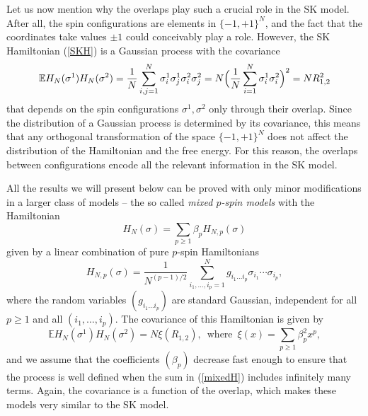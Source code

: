 \documentclass[12pt]{article}
\newcommand{\e}{\mathbb{E}}
\theoremstyle{nonumberplain}
\begin{document}
Let us now mention why the overlaps play such a crucial role in the SK model. After all, the spin configurations are elements in $\{-1,+1\}^N$, and the fact that the coordinates take values $\pm 1$ could conceivably play a role. However, the SK Hamiltonian (\ref{SKH}) is a Gaussian process with the covariance 
\begin{equation}
\e H_N(\sigma^1)H_N(\sigma^2)
=
\frac{1}{N} \sum_{i,j =1}^N \sigma_i^1 \sigma_j^1  \sigma_i^2 \sigma_j^2
=
N\Bigl(
\frac{1}{N} \sum_{i=1}^N \sigma_i^1  \sigma_i^2 
\Bigr)^2
=
N R_{1,2}^2
\label{Cov}
\end{equation}
that depends on the spin configurations $\sigma^1, \sigma^2$ only through their overlap. Since the distribution of a Gaussian process is determined by its covariance, this means that any orthogonal transformation of the space $\{-1,+1\}^N$ does not affect the distribution of the Hamiltonian and the free energy. For this reason, the overlaps between configurations encode all the relevant information in the SK model. 

All the results we will present below can be proved with only minor modifications in a larger class of models -- the so called \emph{mixed $p$-spin models} with the Hamiltonian 
\begin{equation}
H_N(\sigma) = \sum_{p\geq 1} \beta_p H_{N,p}(\sigma)
\label{mixedH}
\end{equation}
given by a linear combination of {pure $p$-spin} Hamiltonians
\begin{equation}
H_{N,p}(\sigma)
=
\frac{1}{N^{(p-1)/2}}
\sum_{i_1,\ldots,i_p = 1}^N g_{i_1\ldots i_p} \sigma_{i_1}\cdots\sigma_{i_p},
\label{mixedp}
\end{equation}
where the random variables $(g_{i_1\ldots i_p})$ are standard Gaussian, independent for all $p\geq 1$ and all $(i_1,\ldots,i_p)$. The covariance of this Hamiltonian is given by
\begin{equation}
\e H_N(\sigma^1) H_N(\sigma^2) = N\xi(R_{1,2}),
\,\mbox{ where }\, \xi(x)=\sum_{p\geq 1}\beta_p^2 x^p,
\label{Covxi}
\end{equation}
and we assume that the coefficients $(\beta_p)$ decrease fast enough to ensure that the process is well defined when the sum in (\ref{mixedH}) includes infinitely many terms. Again, the covariance is a function of the overlap, which makes these models very similar to the SK model.
\end{document}
